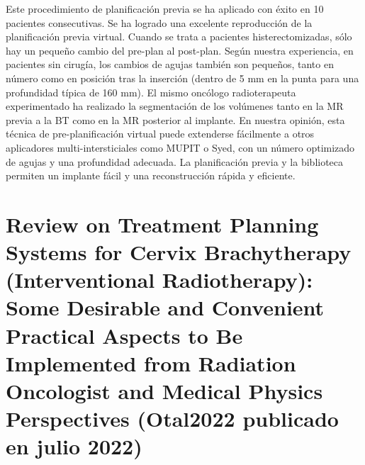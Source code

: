\documentclass[
  a4paper,
]{scrreprt}
\begin{document}
Este procedimiento de planificación previa se ha aplicado con éxito en
10 pacientes consecutivas. Se ha logrado una excelente reproducción de
la planificación previa virtual. Cuando se trata a pacientes
histerectomizadas, sólo hay un pequeño cambio del pre-plan al post-plan.
Según nuestra experiencia, en pacientes sin cirugía, los cambios de
agujas también son pequeños, tanto en número como en posición tras la
inserción (dentro de 5 mm en la punta para una profundidad típica de 160
mm). El mismo oncólogo radioterapeuta experimentado ha realizado la
segmentación de los volúmenes tanto en la MR previa a la BT como en la
MR posterior al implante. En nuestra opinión, esta técnica de
pre-planificación virtual puede extenderse fácilmente a otros
aplicadores multi-intersticiales como MUPIT o Syed, con un número
optimizado de agujas y una profundidad adecuada. La planificación previa
y la biblioteca permiten un implante fácil y una reconstrucción rápida y
eficiente.

\hypertarget{review-on-treatment-planning-systems-for-cervix-brachytherapy-interventional-radiotherapy-some-desirable-and-convenient-practical-aspects-to-be-implemented-from-radiation-oncologist-and-medical-physics-perspectives-otal2022-publicado-en-julio-2022-2}{%
\section{Review on Treatment Planning Systems for Cervix Brachytherapy
(Interventional Radiotherapy): Some Desirable and Convenient Practical
Aspects to Be Implemented from Radiation Oncologist and Medical Physics
Perspectives (Otal2022 publicado en julio
2022)}\label{review-on-treatment-planning-systems-for-cervix-brachytherapy-interventional-radiotherapy-some-desirable-and-convenient-practical-aspects-to-be-implemented-from-radiation-oncologist-and-medical-physics-perspectives-otal2022-publicado-en-julio-2022-2}}
\end{document}
